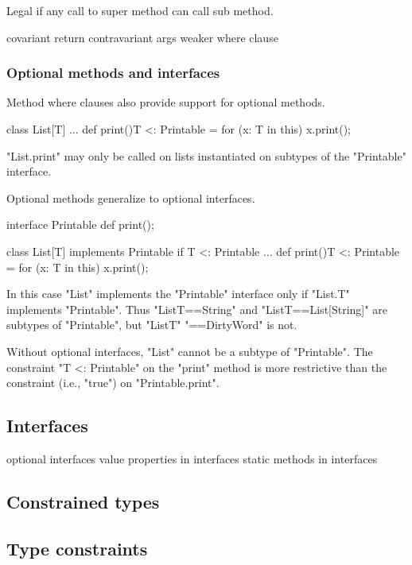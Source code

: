 \documentclass[preprint,nocopyrightspace,9pt]{sigplanconf}
\begin{document}
Legal if any call to super method can call sub method.

covariant return
contravariant args
weaker where clause

\subsubsection{Optional methods and interfaces}

Method where clauses also provide support for optional methods.

\begin{xten}
class List[T] {
    ...
    def print(){T <: Printable} = {
        for (x: T in this)
            x.print();
    }
}
\end{xten}

\xcd"List.print" may only be called on lists instantiated on
subtypes of the \xcd"Printable" interface.

Optional methods generalize to optional interfaces.

\begin{xten}
interface Printable { def print(); }

class List[T] implements Printable if {T <: Printable} {
    ...
    def print(){T <: Printable} = {
        for (x: T in this)
            x.print();
    }
}
\end{xten}

In this case \xcd"List" implements the \xcd"Printable" interface
only if \xcd"List.T" implements \xcd"Printable".
Thus \xcd"List{T==String}"
and \xcd"List{T==List[String]}"
are subtypes of \xcd"Printable", but
\xcd"List{T" \xcd"==DirtyWord}" is not.


Without optional interfaces, \xcd"List" cannot be a subtype
of \xcd"Printable".  The constraint \xcd"{T <: Printable}" on
the \xcd"print" method is more restrictive than the 
constraint (i.e., \xcd"true") on 
\xcd"Printable.print".

\subsection{Interfaces}

optional interfaces
value properties in interfaces
static methods in interfaces

\subsection{Constrained types}

\subsection{Type constraints}
\end{document}
